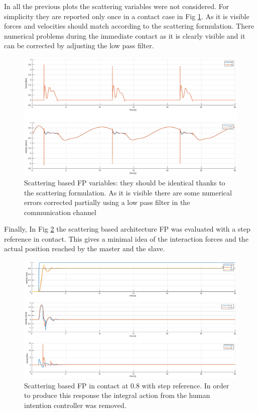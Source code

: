\documentclass[a4paper,12pt]{article}
\begin{document}
In all the previous plots the scattering variables were not considered. For simplicity they are reported only once in a contact case in Fig \ref{fig:scat_var}. As it is visible forces and velocities should match according to the scattering formulation. There numerical problems during the immediate contact as it is clearly visible and it can be corrected by adjusting the low pass filter.
\begin{figure}[H]
    \begin{center}
        \hspace*{-4.5cm}
        \includegraphics[scale=0.5]{images/scatt_pf.eps}
    \end{center}
    \caption{Scattering based FP variables: they should be identical thanks to the scattering formulation. As it is visible there are some numerical errors corrected partially using a low pass filter in the communication channel}
    \label{fig:scat_var}
\end{figure}

Finally, In Fig \ref{fig:scatt_pf_step} the scattering based architecture FP was evaluated with a step reference in contact. This gives a minimal idea of the interaction forces and the actual position reached by the master and the slave.

\begin{figure}[H]
    \begin{center}
        \hspace*{-4.5cm}
        \includegraphics[scale=0.5]{images/scatt_pf_step.eps}
    \end{center}
    \caption{Scattering based FP in contact at 0.8 with step reference. In order to produce this response the integral action from the human intention controller was removed.}
    \label{fig:scatt_pf_step}
\end{figure}
\end{document}
